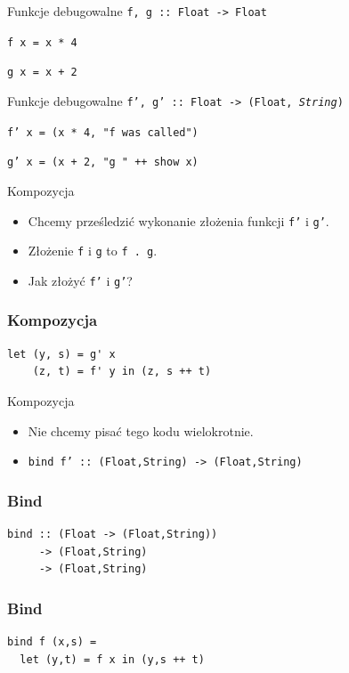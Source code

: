 \documentclass[14pt]{beamer}
\begin{document}
\begin{frame}{Funkcje debugowalne}
    \texttt{f, g :: Float -> Float}
    \pause

    \texttt{f x = x * 4}

    \texttt{g x = x + 2}
\end{frame}

\begin{frame}{Funkcje debugowalne}
    \texttt{f', g' :: Float -> (Float, \emph{String})}
    \pause

    \texttt{f' x = (x * 4, "f was called")}

    \texttt{g' x = (x + 2, "g " ++ show x)}
\end{frame}

\begin{frame}{Kompozycja}
    \begin{itemize}
        \item Chcemy prześledzić wykonanie złożenia funkcji \texttt{f'}
            i \texttt{g'}.
        \item Złożenie \texttt{f} i \texttt{g} to \texttt{f . g}.
        \item Jak złożyć \texttt{f'} i \texttt{g'}?
    \end{itemize}
\end{frame}

\begin{frame}[fragile]
\frametitle{Kompozycja}
\begin{verbatim}
let (y, s) = g' x
    (z, t) = f' y in (z, s ++ t)
\end{verbatim}
\end{frame}

\begin{frame}{Kompozycja}
    \begin{itemize}
        \item Nie chcemy pisać tego kodu wielokrotnie.
        \item \texttt{bind f' :: (Float,String) -> (Float,String)}
    \end{itemize}
\end{frame}

\begin{frame}[fragile]
\frametitle{Bind}
\begin{verbatim}
bind :: (Float -> (Float,String))
     -> (Float,String)
     -> (Float,String)
\end{verbatim}
\end{frame}

\begin{frame}[fragile]
\frametitle{Bind}
\begin{verbatim}
bind f (x,s) =
  let (y,t) = f x in (y,s ++ t)
\end{verbatim}
\end{frame}
\end{document}
